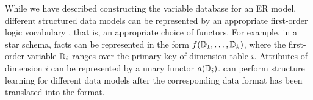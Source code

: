 \documentclass{IEEEtran}
\begin{document}
While we have described constructing the variable database for an ER model, different structured data models can be represented by an appropriate first-order logic vocabulary \cite{Kimmig2015}, that is, an appropriate choice of functors. For example, in a star schema, facts can be represented in the form $f(\mathbb{D}_{1},\ldots,\mathbb{D}_{k})$, where the first-order variable $\mathbb{D}_{i}$ ranges over the primary key of dimension table $i$. Attributes of dimension $i$ can be represented by a unary functor $a(\mathbb{D}_{i})$. \FB can perform structure learning for different data models after the corresponding data format has been translated into the \RVD format.

%

\end{document}
